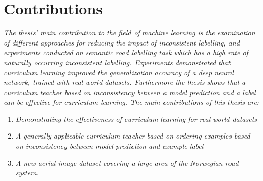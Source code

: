 \section{Contributions}
\label{sec:IntroContributions}
{\it
The thesis' main contribution to the field of machine learning  is the examination of different approaches for reducing the impact of inconsistent labelling, and experiments conducted on semantic road labelling task which has a high rate of naturally occurring inconsistent labelling. Experiments demonstrated that curriculum learning improved the generalization accuracy of a deep neural network, trained with real-world datasets. Furthermore the thesis shows that a curriculum teacher based on inconsistency between a model prediction and a label can be effective for curriculum learning. The main contributions of this thesis are:}

\begin{enumerate}
\item {\it Demonstrating the effectiveness of curriculum learning for real-world datasets}
\item {\it A generally applicable curriculum teacher based on ordering examples based on inconsistency between model prediction and example label}
\item {\it A new aerial image dataset covering a large area of the Norwegian road system.}
\end{enumerate}